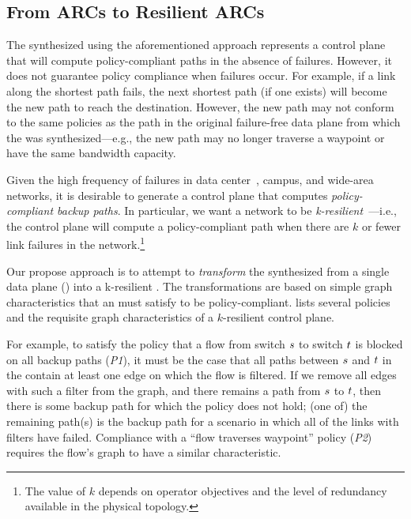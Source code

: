 \subsection{From ARCs to Resilient ARCs}

The \ARC synthesized using the aforementioned approach represents a control
plane that will compute policy-compliant paths in the absence of failures.
However, it does not guarantee policy compliance when failures occur. For
example, if a link along the shortest path fails, the next shortest path (if
one exists) will become the new path to reach the destination. However, the
new path may not conform to the same policies as the path in the original
failure-free data plane from which the \ARC was synthesized---e.g., the new
path may no longer traverse a waypoint or have the same bandwidth capacity.

Given the high frequency of failures in data center~\cite{datacenterfailures},
campus, and wide-area~\cite{turner10:sigcomm} networks, it is desirable to
generate a control plane that computes {\em policy-compliant backup paths}.
In particular, we want a network to be {\em k-resilient}~\cite{plinko}---i.e.,
the control plane will compute a policy-compliant path when there are $k$ or
fewer link failures in the network.\footnote{The value of $k$ depends on
operator objectives and the level of redundancy available in the physical
topology.} 




Our propose  approach is to attempt to {\em transform} the \ARC synthesized from a single
data plane () into a k-resilient \ARC.
The transformations are based on simple graph characteristics that an \ARC
must satisfy to be policy-compliant.  
lists several policies and the requisite graph characteristics of a
$k$-resilient control plane. 

For example, to satisfy the policy that a flow from switch $s$ to
switch $t$ is blocked on all backup paths ({\em P1}), it must be the
case that all paths between $s$ and $t$ in the \ARC contain
at least one edge on which the flow is filtered. If we remove all edges with
such a filter from the graph, and there remains a path from $s$ to
$t$, then there is some backup path for which the policy does not
hold; (one of) the remaining path(s) is the backup path for a scenario in
which all of the links with filters have failed. Compliance with a ``flow
traverses waypoint'' policy ({\em P2}) requires the flow's graph to have a
similar characteristic.

